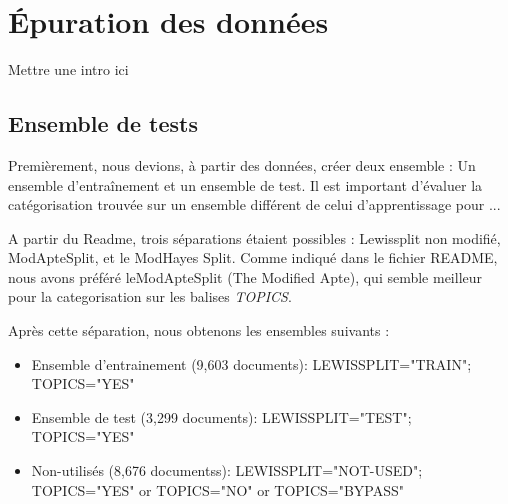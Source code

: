 \section{Épuration des données}
Mettre une intro ici
\subsection{Ensemble de tests}
Premièrement, nous devions, à partir des données, créer deux ensemble : Un ensemble d'entraînement et un ensemble de test. Il est important d'évaluer la catégorisation trouvée sur un ensemble différent de celui d'apprentissage pour ...

A partir du Readme, trois séparations étaient possibles : Lewissplit non modifié, ModApteSplit, et le ModHayes Split.
Comme indiqué dans le fichier \textsc{README}, nous avons préféré leModApteSplit (The Modified Apte), qui semble meilleur pour la categorisation sur les balises \textit{TOPICS}.

Après cette séparation, nous obtenons les ensembles suivants : 
\begin{itemize}
\item Ensemble d'entrainement (9,603 documents): LEWISSPLIT="TRAIN";  TOPICS="YES"
\item Ensemble de test (3,299 documents): LEWISSPLIT="TEST"; TOPICS="YES"
\item Non-utilisés (8,676 documentss):   LEWISSPLIT="NOT-USED"; TOPICS="YES" or TOPICS="NO"  or TOPICS="BYPASS"
\end{itemize}
